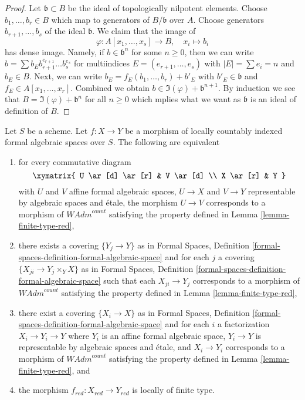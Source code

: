 \begin{proof}
Let $\mathfrak b \subset B$ be the
ideal of topologically nilpotent elements. Choose $b_1, \ldots, b_r \in B$
which map to generators of $B/\mathfrak b$ over $A$.
Choose generators $b_{r + 1}, \ldots, b_s$ of the ideal
$\mathfrak b$. We claim that the image of
$$
\varphi : A[x_1, \ldots, x_s] \longrightarrow B, \quad
x_i \longmapsto b_i
$$
has dense image. Namely, if $b \in \mathfrak b^n$ for some $n \geq 0$,
then we can write
$b = \sum b_E b_{r + 1}^{e_{r + 1}} \ldots b_s^{e_s}$ for multiindices
$E = (e_{r + 1}, \ldots, e_s)$ with $|E| = \sum e_i = n$ and $b_E \in B$.
Next, we can write $b_E = f_E(b_1, \ldots, b_r) + b'_E$
with $b'_E \in \mathfrak b$ and $f_E \in A[x_1, \ldots, x_r]$.
Combined we obtain $b \in \Im(\varphi) + \mathfrak b^{n + 1}$.
By induction we see that $B = \Im(\varphi) + \mathfrak b^n$ for all
$n \geq 0$ which mplies what we want as $\mathfrak b$ is an ideal
of definition of $B$.
\end{proof}

\begin{lemma}
\label{lemma-finite-type-red-morphisms}
Let $S$ be a scheme. Let $f : X \to Y$ be a morphism of
locally countably indexed formal algebraic spaces over $S$.
The following are equivalent
\begin{enumerate}
\item for every commutative diagram
$$
\xymatrix{
U \ar[d] \ar[r] & V \ar[d] \\
X \ar[r] & Y
}
$$
with $U$ and $V$ affine formal algebraic spaces, $U \to X$ and $V \to Y$
representable by algebraic spaces and \'etale, the morphism $U \to V$
corresponds to a morphism of $\textit{WAdm}^{count}$ satisfying the
property defined in Lemma \ref{lemma-finite-type-red},
\item there exists a covering $\{Y_j \to Y\}$ as in
Formal Spaces,
Definition \ref{formal-spaces-definition-formal-algebraic-space}
and for each $j$
a covering $\{X_{ji} \to Y_j \times_Y X\}$ as in
Formal Spaces,
Definition \ref{formal-spaces-definition-formal-algebraic-space}
such that each $X_{ji} \to Y_j$  corresponds
to a morphism of $\textit{WAdm}^{count}$ satisfying the
property defined in Lemma \ref{lemma-finite-type-red},
\item there exist a covering $\{X_i \to X\}$ as in
Formal Spaces,
Definition \ref{formal-spaces-definition-formal-algebraic-space}
and for each $i$ a factorization $X_i \to Y_i \to Y$ where $Y_i$
is an affine formal algebraic space, $Y_i \to Y$ is representable
by algebraic spaces and \'etale, and $X_i \to Y_i$ corresponds
to a morphism of $\textit{WAdm}^{count}$ satisfying the
property defined in Lemma \ref{lemma-finite-type-red}, and
\item the morphism $f_{red} : X_{red} \to Y_{red}$ is locally of finite type.
\end{enumerate}
\end{lemma}


